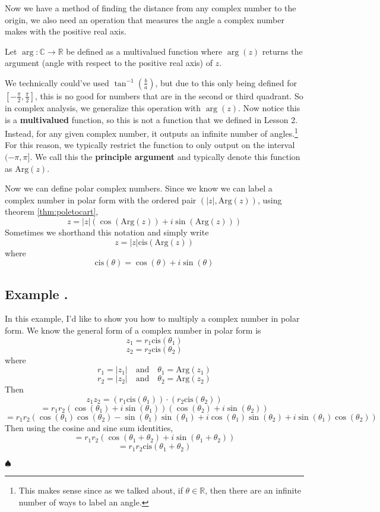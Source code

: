 \documentclass[11pt]{article}
\numberwithin{lemma}{section}
\numberwithin{equation}{section}
\numberwithin{define}{section}
\numberwithin{prop}{section}
\numberwithin{figure}{section}
\numberwithin{theorem}{section}
\numberwithin{cor}{section}
\newcounter{ex}[section]
\newenvironment{ex}[0]{

	\refstepcounter{ex}
    \subsection*{Example \theex .}
    }
    {
    \hfill$\spadesuit$
    \par
    }
\numberwithin{ex}{section}
\def\real{\mathbb{R}}
\def\complex{\mathbb{C}}
\def\paren#1{\left(#1\right)}
\def\sbrak#1{\left[#1\right]}
\def\jand{\quad\text{and}\quad}
\begin{document}
Now we have a method of finding the distance from any complex number to the origin, we also need an operation that measures the angle a complex number makes with the positive real axis.
\begin{define}
	Let $\arg: \complex \to \real$ be defined as a multivalued function where $\arg(z)$ returns the argument (angle with respect to the positive real axis) of $z$.
\end{define}

We technically could've used $\tan^{-1}\paren{\frac{b}{a}}$, but due to this only being defined for $\sbrak{-\frac{\pi}{2},\frac{\pi}{2}}$, this is no good for numbers that are in the second or third quadrant. So in complex analysis, we generalize this operation with $\arg(z)$. Now notice this is a \textbf{multivalued} function, so this is not a function that we defined in Lesson 2. Instead, for any given complex number, it outputs an infinite number of angles.\footnote{
This makes sense since as we talked about, if $\theta\in\real$, then there are an infinite number of ways to label an angle.}
For this reason, we typically restrict the function to only output on the interval $(-\pi,\pi]$. We call this the \textbf{principle argument} and typically denote this function as $\text{Arg}(z)$.

Now we can define polar complex numbers. Since we know we can label a complex number in polar form with the ordered pair $(|z|,\text{Arg}(z))$, using theorem \eqref{thm:poletocart},
$$z=|z|(\cos(\text{Arg}(z))+i\sin(\text{Arg}(z)))$$
Sometimes we shorthand this notation and simply write
$$z=|z|\text{cis}(\text{Arg}(z))$$
where
$$\text{cis}(\theta)=\cos(\theta)+i\sin(\theta)$$

\begin{ex}
	In this example, I'd like to show you how to multiply a complex number in polar form. We know the general form of a complex number in polar form is
	$$z_1=r_1\text{cis}(\theta_1)$$
	$$z_2=r_2\text{cis}(\theta_2)$$
	where
	$$r_1=|z_1| \jand \theta_1=\text{Arg}(z_1)$$
	$$r_2=|z_2| \jand \theta_2=\text{Arg}(z_2)$$
	Then
	$$z_1z_2=(r_1\text{cis}(\theta_1)) \cdot (r_2\text{cis}(\theta_2))$$
	$$=r_1r_2(\cos(\theta_1)+i\sin(\theta_1))(\cos(\theta_2)+i\sin(\theta_2))$$
	$$=r_1r_2(\cos(\theta_1)\cos(\theta_2)-\sin(\theta_1)\sin(\theta_1)+i\cos(\theta_1)\sin(\theta_2)+i\sin(\theta_1)\cos(\theta_2))$$
	Then using the cosine and sine sum identities,
	$$=r_1r_2(\cos(\theta_1+\theta_2)+i\sin(\theta_1+\theta_2))$$
	$$=r_1r_2\text{cis}(\theta_1+\theta_2)$$
\end{ex}
\end{document}
